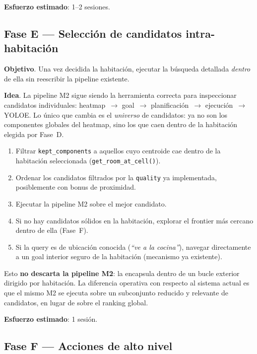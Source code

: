\documentclass[11pt,a4paper]{article}
\begin{document}
\textbf{Esfuerzo estimado}: 1--2 sesiones.

\subsection{Fase E --- Selección de candidatos intra-habitación}

\textbf{Objetivo}. Una vez decidida la habitación, ejecutar la búsqueda
detallada \emph{dentro} de ella sin reescribir la pipeline existente.

\textbf{Idea}. La pipeline M2 sigue siendo la herramienta correcta para
inspeccionar candidatos individuales: heatmap~$\rightarrow$ goal~$\rightarrow$
planificación~$\rightarrow$ ejecución~$\rightarrow$ YOLOE. Lo único que
cambia es el \emph{universo} de candidatos: ya no son los componentes
globales del heatmap, sino los que caen dentro de la habitación elegida por
Fase~D.

\begin{enumerate}
  \item Filtrar \texttt{kept\_components} a aquellos cuyo centroide cae
        dentro de la habitación seleccionada
        (\texttt{get\_room\_at\_cell()}).
  \item Ordenar los candidatos filtrados por la \texttt{quality} ya
        implementada, posiblemente con bonus de proximidad.
  \item Ejecutar la pipeline M2 sobre el mejor candidato.
  \item Si no hay candidatos sólidos en la habitación, explorar el frontier
        más cercano dentro de ella (Fase~F).
  \item Si la query es de ubicación conocida (\textit{``ve a la cocina''}),
        navegar directamente a un goal interior seguro de la habitación
        (mecanismo ya existente).
\end{enumerate}

Esto \textbf{no descarta la pipeline M2}: la encapsula dentro de un bucle
exterior dirigido por habitación. La diferencia operativa con respecto al
sistema actual es que el mismo M2 se ejecuta sobre un subconjunto reducido y
relevante de candidatos, en lugar de sobre el ranking global.

\textbf{Esfuerzo estimado}: 1 sesión.

\subsection{Fase F --- Acciones de alto nivel}
\end{document}
